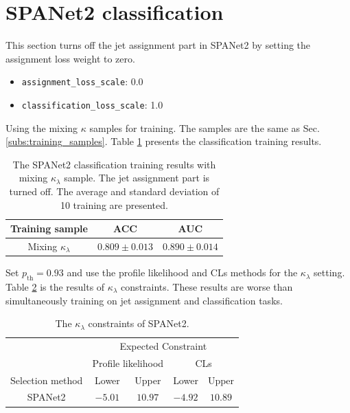 \documentclass[12pt]{article}
\begin{document}
\section{SPANet2 classification}%
\label{sec:spanet2_classification}
	This section turns off the jet assignment part in SPANet2 by setting the assignment loss weight to zero.
	\begin{itemize}
		\item \verb+assignment_loss_scale+: 0.0
		\item \verb+classification_loss_scale+: 1.0
	\end{itemize}

	Using the mixing $\kappa$ samples for training. The samples are the same as Sec. \ref{subs:training_samples}. Table \ref{tab:SPANET_no_pairing_cls_results} presents the classification training results.
	\begin{table}[htpb]
		\centering
		\caption{The SPANet2 classification training results with mixing $\kappa_\lambda$ sample. The jet assignment part is turned off. The average and standard deviation of 10 training are presented.}
		\label{tab:SPANET_no_pairing_cls_results}
		\begin{tabular}{c|cc}
		Training sample        & ACC     & AUC   \\ \hline
		Mixing $\kappa_\lambda $ & $0.809 \pm 0.013$ & $0.890 \pm 0.014$
		\end{tabular}      
	\end{table}

	Set $p_\text{th} = 0.93$ and use the profile likelihood and CLs methods for the $\kappa_\lambda$ setting. Table \ref{tab:kappa_constraint_SPANet_no_pair} is the results of $\kappa_\lambda$ constraints. These results are worse than simultaneously training on jet assignment and classification tasks.
	\begin{table}[htpb]
		\centering
		\caption{The $\kappa_\lambda$ constraints of SPANet2.}
		\label{tab:kappa_constraint_SPANet_no_pair}
		\begin{tabular}{c|cc|cc}
							  & \multicolumn{4}{c}{Expected Constraint}                          \\
							  & \multicolumn{2}{c}{Profile likelihood} & \multicolumn{2}{c}{CLs} \\ \hline
		Selection method      & Lower              & Upper             & Lower      & Upper      \\ \hline
		SPANet2      & $-5.01$            & $10.97$             & $-4.92$      & $10.89$      \\
		\end{tabular}
	\end{table}
\end{document}
